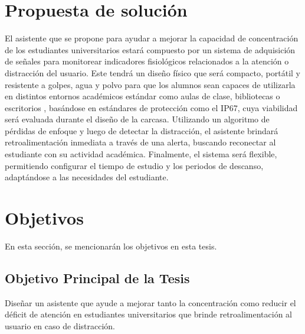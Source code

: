 \section{Propuesta de solución}
\label{sec:CH01_Propuesta}
El asistente que se propone para ayudar a mejorar la capacidad de concentración de los estudiantes universitarios estará compuesto por un sistema de adquisición de señales para monitorear indicadores fisiológicos relacionados a la atención o distracción del usuario. Este tendrá un diseño físico que será compacto, portátil y resistente a golpes, agua y polvo para que los alumnos sean capaces de utilizarla en distintos entornos académicos estándar como aulas de clase, bibliotecas o escritorios , basándose en estándares de protección como el IP67, cuya viabilidad será evaluada durante el diseño de la carcasa. Utilizando un algoritmo de pérdidas de enfoque y luego de detectar la distracción, el asistente brindará retroalimentación inmediata a través de una alerta, buscando reconectar al estudiante con su actividad académica. Finalmente, el sistema será flexible, permitiendo configurar el tiempo de estudio y los periodos de descanso, adaptándose a las necesidades del estudiante.
    
    \section{Objetivos}
    \label{sec:CH01_Objetivos}
        En esta sección, se mencionarán los  objetivos en esta tesis.
        
        \subsection{Objetivo Principal de la Tesis}
        
           
    
                Diseñar un asistente que ayude a mejorar tanto la concentración como reducir el déficit de atención en estudiantes universitarios que brinde retroalimentación al usuario en caso de distracción.
                
                
            
